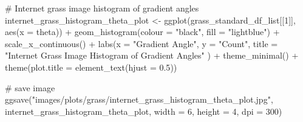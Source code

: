\documentclass[
  letterpaper,
  DIV=11,
  numbers=noendperiod]{scrreprt}
\newenvironment{Shaded}{\begin{snugshade}}{\end{snugshade}}
\newcommand{\AttributeTok}[1]{\textcolor[rgb]{0.40,0.45,0.13}{#1}}
\newcommand{\CommentTok}[1]{\textcolor[rgb]{0.37,0.37,0.37}{#1}}
\newcommand{\DecValTok}[1]{\textcolor[rgb]{0.68,0.00,0.00}{#1}}
\newcommand{\FloatTok}[1]{\textcolor[rgb]{0.68,0.00,0.00}{#1}}
\newcommand{\FunctionTok}[1]{\textcolor[rgb]{0.28,0.35,0.67}{#1}}
\newcommand{\NormalTok}[1]{\textcolor[rgb]{0.00,0.23,0.31}{#1}}
\newcommand{\OtherTok}[1]{\textcolor[rgb]{0.00,0.23,0.31}{#1}}
\newcommand{\SpecialCharTok}[1]{\textcolor[rgb]{0.37,0.37,0.37}{#1}}
\newcommand{\StringTok}[1]{\textcolor[rgb]{0.13,0.47,0.30}{#1}}
\begin{document}
\begin{Shaded}
\begin{Highlighting}[]
\CommentTok{\# Internet grass image histogram of gradient angles}
\NormalTok{internet\_grass\_histogram\_theta\_plot }\OtherTok{\textless{}{-}}
  \FunctionTok{ggplot}\NormalTok{(grass\_standard\_df\_list[[}\DecValTok{1}\NormalTok{]], }
         \FunctionTok{aes}\NormalTok{(}\AttributeTok{x =}\NormalTok{ theta)) }\SpecialCharTok{+}
  \FunctionTok{geom\_histogram}\NormalTok{(}\AttributeTok{colour =} \StringTok{"black"}\NormalTok{, }\AttributeTok{fill =} \StringTok{"lightblue"}\NormalTok{) }\SpecialCharTok{+}
  \FunctionTok{scale\_x\_continuous}\NormalTok{() }\SpecialCharTok{+} 
  \FunctionTok{labs}\NormalTok{(}\AttributeTok{x =} \StringTok{"Gradient Angle"}\NormalTok{, }
       \AttributeTok{y =} \StringTok{"Count"}\NormalTok{, }
       \AttributeTok{title =} \StringTok{"Internet Grass Image Histogram of Gradient Angles"}
\NormalTok{       ) }\SpecialCharTok{+}
  \FunctionTok{theme\_minimal}\NormalTok{() }\SpecialCharTok{+}
  \FunctionTok{theme}\NormalTok{(}\AttributeTok{plot.title =} \FunctionTok{element\_text}\NormalTok{(}\AttributeTok{hjust =} \FloatTok{0.5}\NormalTok{))}

\CommentTok{\# save image}
\FunctionTok{ggsave}\NormalTok{(}\StringTok{"images/plots/grass/internet\_grass\_histogram\_theta\_plot.jpg"}\NormalTok{, internet\_grass\_histogram\_theta\_plot, }\AttributeTok{width =} \DecValTok{6}\NormalTok{, }\AttributeTok{height =} \DecValTok{4}\NormalTok{, }\AttributeTok{dpi =} \DecValTok{300}\NormalTok{)}
\end{Highlighting}
\end{Shaded}
\end{document}
